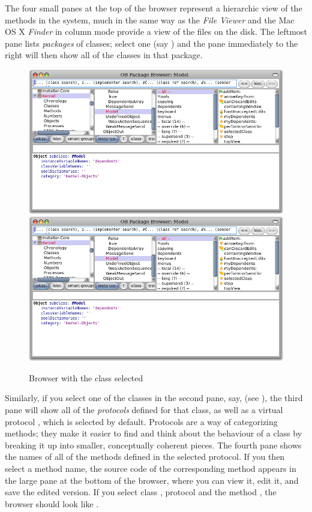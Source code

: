 \documentclass[a4paper,10pt,twoside]{book}
\begin{document}
The four small panes at the top of the browser represent a hierarchic view of the methods in the system, much in the same way as the  \textit{File Viewer} and the Mac OS X \textit{Finder} in column mode provide a view of the files on the disk.
The leftmost pane lists \emph{packages} of classes; select one (say ) and the pane immediately to the right will then show all of the classes in that package.

\begin{figure}[htbp]
   \centering
   \ifluluelse
	   {\includegraphics[width=\textwidth]{SystemBrowser1} }
	   {\includegraphics[width=.7\textwidth]{SystemBrowser1} }
   \caption{Browser with the class  selected
   }
\end{figure}

Similarly, if you select one of the classes in the second pane, say,  (see  ), the third pane will show all of the \emph{protocols} defined for that class, as well as a virtual protocol , which is selected by default. 
Protocols are a way of categorizing methods; they make it easier to find and think about the behaviour of a class by breaking it up into smaller, conceptually coherent pieces.  
The fourth pane shows the names of all of the methods defined in the selected protocol.
If you then select a method name, the source code of the corresponding method appears in the large pane at the bottom of the browser, where you can view it, edit it, and save the edited version.
If you select class ,  protocol  and the method , the browser should look like .
\end{document}
